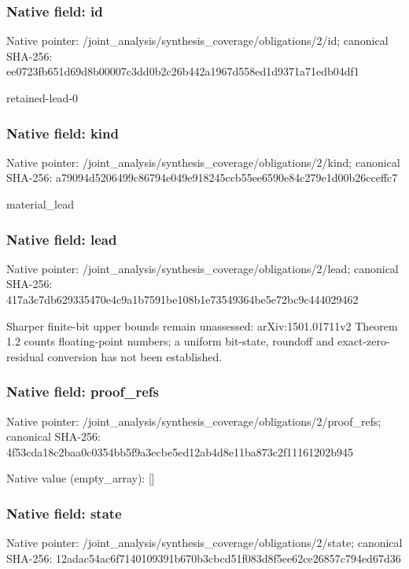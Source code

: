 \documentclass[10pt,a4paper]{article}
\begin{document}
\subsubsection{Native field: id}
Native pointer: /joint\_\allowbreak{}analysis/synthesis\_\allowbreak{}coverage/obligations/2/id; canonical SHA-256: ee0723fb651d69d8b00007c3dd0b2c26b442a1967d558ed1d9371a71edb04df1

\begingroup\raggedright\sloppy retained-lead-0\par\endgroup

\subsubsection{Native field: kind}
Native pointer: /joint\_\allowbreak{}analysis/synthesis\_\allowbreak{}coverage/obligations/2/kind; canonical SHA-256: a79094d5206499c86794e049e918245ccb55ee6590e84c279e1d00b26cceffc7

\begingroup\raggedright\sloppy material\_\allowbreak{}lead\par\endgroup

\subsubsection{Native field: lead}
Native pointer: /joint\_\allowbreak{}analysis/synthesis\_\allowbreak{}coverage/obligations/2/lead; canonical SHA-256: 417a3c7db629335470e4c9a1b7591be108b1e73549364be5e72bc9c444029462

\begingroup\raggedright\sloppy Sharper finite-bit upper bounds remain unassessed:\allowbreak{} arXiv:\allowbreak{}1501.01711v2 Theorem 1.2 counts floating-point numbers;\allowbreak{} a uniform bit-state,\allowbreak{} roundoff and exact-zero-residual conversion has not been established.\par\endgroup

\subsubsection{Native field: proof\_\allowbreak{}refs}
Native pointer: /joint\_\allowbreak{}analysis/synthesis\_\allowbreak{}coverage/obligations/2/proof\_\allowbreak{}refs; canonical SHA-256: 4f53cda18c2baa0c0354bb5f9a3ecbe5ed12ab4d8e11ba873c2f11161202b945

Native value (empty\_\allowbreak{}array): []

\subsubsection{Native field: state}
Native pointer: /joint\_\allowbreak{}analysis/synthesis\_\allowbreak{}coverage/obligations/2/state; canonical SHA-256: 12adac54ac6f7140109391b670b3cbcd51f083d8f5ee62ce26857c794ed67d36
\end{document}
